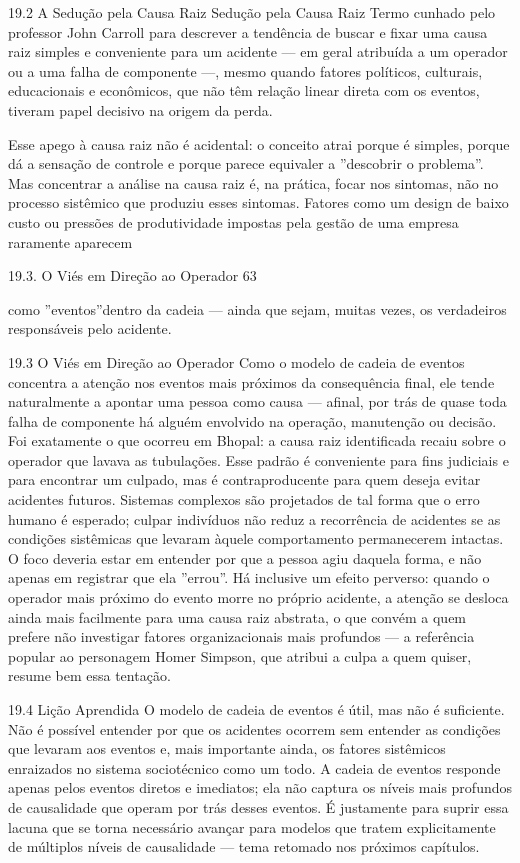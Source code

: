 19.2 A Sedução pela Causa Raiz Sedução pela Causa Raiz Termo cunhado pelo professor John Carroll para descrever a tendência de buscar e fixar uma causa raiz simples e conveniente para um acidente — em geral atribuída a um operador ou a uma falha de componente —, mesmo quando fatores políticos, culturais, educacionais e econômicos, que não têm relação linear direta com os eventos, tiveram papel decisivo na origem da perda.

Esse apego à causa raiz não é acidental: o conceito atrai porque é simples, porque dá a sensação de controle e porque parece equivaler a ”descobrir o problema”. Mas concentrar a análise na causa raiz é, na prática, focar nos sintomas, não no processo sistêmico que produziu esses sintomas. Fatores como um design de baixo custo ou pressões de produtividade impostas pela gestão de uma empresa raramente aparecem

19.3. O Viés em Direção ao Operador 63

como ”eventos”dentro da cadeia — ainda que sejam, muitas vezes, os verdadeiros responsáveis pelo acidente.

19.3 O Viés em Direção ao Operador Como o modelo de cadeia de eventos concentra a atenção nos eventos mais próximos da consequência final, ele tende naturalmente a apontar uma pessoa como causa — afinal, por trás de quase toda falha de componente há alguém envolvido na operação, manutenção ou decisão. Foi exatamente o que ocorreu em Bhopal: a causa raiz identificada recaiu sobre o operador que lavava as tubulações. Esse padrão é conveniente para fins judiciais e para encontrar um culpado, mas é contraproducente para quem deseja evitar acidentes futuros. Sistemas complexos são projetados de tal forma que o erro humano é esperado; culpar indivíduos não reduz a recorrência de acidentes se as condições sistêmicas que levaram àquele comportamento permanecerem intactas. O foco deveria estar em entender por que a pessoa agiu daquela forma, e não apenas em registrar que ela ”errou”. Há inclusive um efeito perverso: quando o operador mais próximo do evento morre no próprio acidente, a atenção se desloca ainda mais facilmente para uma causa raiz abstrata, o que convém a quem prefere não investigar fatores organizacionais mais profundos — a referência popular ao personagem Homer Simpson, que atribui a culpa a quem quiser, resume bem essa tentação.

19.4 Lição Aprendida O modelo de cadeia de eventos é útil, mas não é suficiente. Não é possível entender por que os acidentes ocorrem sem entender as condições que levaram aos eventos e, mais importante ainda, os fatores sistêmicos enraizados no sistema sociotécnico como um todo. A cadeia de eventos responde apenas pelos eventos diretos e imediatos; ela não captura os níveis mais profundos de causalidade que operam por trás desses eventos. É justamente para suprir essa lacuna que se torna necessário avançar para modelos que tratem explicitamente de múltiplos níveis de causalidade — tema retomado nos próximos capítulos.

